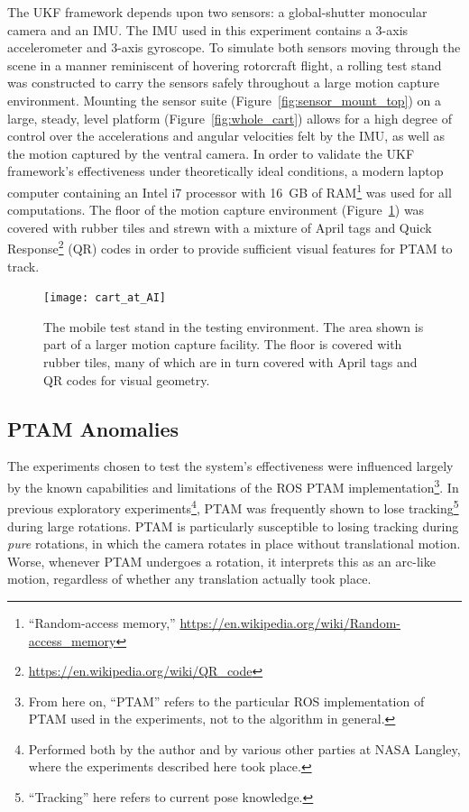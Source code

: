 The UKF framework depends upon two sensors: a global-shutter monocular camera and an IMU. The IMU used in this experiment contains a 3-axis accelerometer and 3-axis gyroscope. To simulate both sensors moving through the scene in a manner reminiscent of hovering rotorcraft flight, a rolling test stand was constructed to carry the sensors safely throughout a large motion capture environment. Mounting the sensor suite (Figure~\ref{fig:sensor_mount_top}) on a large, steady, level platform (Figure~\ref{fig:whole_cart}) allows for a high degree of control over the accelerations and angular velocities felt by the IMU, as well as the motion captured by the ventral camera. In order to validate the UKF framework's effectiveness under theoretically ideal conditions, a modern laptop computer containing an Intel i7 processor with 16~GB of RAM\footnote{``Random-access memory,'' \url{https://en.wikipedia.org/wiki/Random-access_memory}} was used for all computations. The floor of the motion capture environment (Figure~\ref{fig:cart_at_AI}) was covered with rubber tiles and strewn with a mixture of April tags and Quick Response\footnote{\url{https://en.wikipedia.org/wiki/QR_code}} (QR) codes in order to provide sufficient visual features for PTAM to track.

\begin{figure}[H]
  \centering
    \texttt{[image: cart\_at\_AI]}
  \caption[Testing Environment]{The mobile test stand in the testing environment. The area shown is part of a larger motion capture facility. The floor is covered with rubber tiles, many of which are in turn covered with April tags and QR codes for visual geometry.}
  \label{fig:cart_at_AI}
\end{figure}

\subsection{PTAM Anomalies}

The experiments chosen to test the system's effectiveness were influenced largely by the known capabilities and limitations of the ROS PTAM implementation\footnote{From here on, ``PTAM'' refers to the particular ROS implementation of PTAM used in the experiments, not to the algorithm in general.}. In previous exploratory experiments\footnote{Performed both by the author and by various other parties at NASA Langley, where the experiments described here took place.}, PTAM was frequently shown to lose tracking\footnote{``Tracking'' here refers to current pose knowledge.} during large rotations. PTAM is particularly susceptible to losing tracking during \textit{pure} rotations, in which the camera rotates in place without translational motion. Worse, whenever PTAM undergoes a rotation, it interprets this as an arc-like motion, regardless of whether any translation actually took place.


